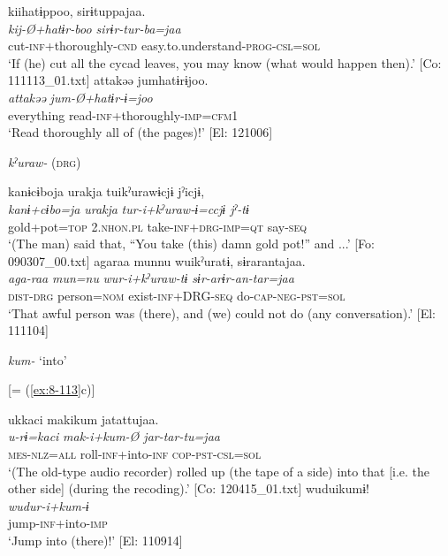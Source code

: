 {\TM}
\glll  kiihatɨppoo,  sirɨtuppajaa.\\
\textit{kij-Ø+hatɨr-boo  sirɨr-tur-ba=jaa}\\
cut-\textsc{inf}+thoroughly-\textsc{cnd}  easy.to.understand-\textsc{prog}-\textsc{csl}=\textsc{sol}\\
\glt ‘If (he) cut all the cycad leaves, you may know (what would happen then).’ [Co: 111113\_01.txt]
\ex
{\TM}
\glll  attakəə  jumhatɨrɨjoo.\\
\textit{attakəə}  \textit{jum-Ø+hatɨr-ɨ=joo}\\
everything  read-\textsc{inf}+thoroughly-\textsc{imp}=\textsc{cfm1}\\
\glt ‘Read thoroughly all of (the pages)!’ [El: 121006]

  \textit{kˀuraw-} (\textsc{drg})

\ex
{\TM}
\glll  kanɨcɨboja  urakja  tuikˀurawɨcjɨ  jˀicjɨ,\\
\textit{kanɨ+cɨbo=ja}  \textit{urakja}  \textit{tur-i+kˀuraw-ɨ=ccjɨ  jˀ-tɨ}\\
gold+pot=\textsc{top}  2.\textsc{nhon}.\textsc{pl}  take-\textsc{inf}+\textsc{drg}-\textsc{imp}=\textsc{qt}  say-\textsc{seq}\\
\glt ‘(The man) said that, “You take (this) damn gold pot!” and ...’ [Fo: 090307\_00.txt]
\ex
{\TM}
\glll  agaraa  munnu  wuikˀuratɨ,  sɨrarantajaa.\\
\textit{aga-raa}  \textit{mun=nu}  \textit{wur-i+kˀuraw-tɨ  sɨr-arɨr-an-tar=jaa}\\
\textsc{dist}-\textsc{drg}  person=\textsc{nom}  exist-\textsc{inf}+DRG-\textsc{seq}  do-\textsc{cap}-\textsc{neg}-\textsc{pst}=\textsc{sol}\\
\glt ‘That awful person was (there), and (we) could not do (any conversation).’ [El: 111104]

  \textit{kum-} ‘into’


\ex{} [= (\ref{ex:8-113}c)]

{\TM}
\glll  ukkaci  makikum  jatattujaa.\\
\textit{u-rɨ=kaci}  \textit{mak-i+kum-Ø  jar-tar-tu=jaa}\\
\textsc{mes}-\textsc{nlz}=\textsc{all}  roll-\textsc{inf}+into-\textsc{inf}  \textsc{cop}-\textsc{pst}-\textsc{csl}=\textsc{sol}\\
\glt ‘(The old-type audio recorder) rolled up (the tape of a side) into that [i.e. the other side] (during the recoding).’ [Co: 120415\_01.txt]
\ex
{\TM}
\glll  wuduikumɨ!\\
\textit{wudur-i+kum-ɨ}\\
jump-\textsc{inf}+into-\textsc{imp}\\
\glt ‘Jump into (there)!’ [El: 110914]

